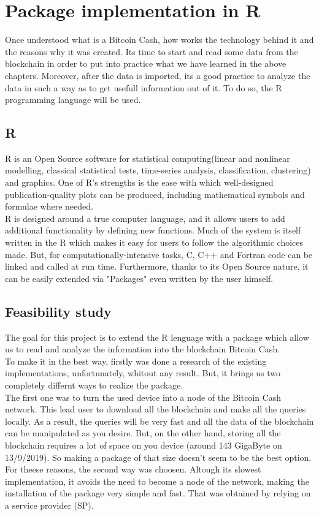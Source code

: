 
\chapter{Package implementation in R}
\label{cha:R}

Once understood what is a Bitcoin Cash, how works the technology behind it and the
reasons why it was created. Its time to start and read some data from the blockchain
in order to put into practice what we have learned in the above chapters. Moreover,
after the data is imported, its a good practice to analyze the data in such a way as to 
get usefull information out of it. To do so, the R programming language will be used.

\section{R}
\label{sec:enivirionment}

R is an Open Source software for statistical computing(linear and nonlinear
 modelling, classical statistical tests, time-series analysis, classification,
 clustering) and graphics. One of R’s strengths is the ease with which well-designed 
 publication-quality plots can be produced, including mathematical symbols and 
 formulae where needed.\\
R is designed around a true computer language, and it allows users to add additional 
functionality by defining new functions. Much of the system is itself written in the 
R which makes it easy for users to follow the algorithmic choices made. But, for
computationally-intensive tasks, C, C++ and Fortran code can be linked and called 
at run time. Furthermore, thanks to its Open Source nature, it can be easily extended
via "Packages" even written by the user himself.\cite{r}

\section{Feasibility study}
\label{sec:study}

The goal for this project is to extend the R lenguage with a package which allow us
to read and analyze the information into the blockchain Bitcoin Cash.\\
To make it in the best way, firstly was done a research of the existing 
implementations, unfortunately, whitout any result. But, it brings us two 
completely differnt ways to realize the package. \\
The first one was to turn the used device into a node of the Bitcoin Cash network.
This lead user to download all the blockchain and make all the queries locally.
As a result, the queries will be very fast and all the data of the blockchain can
be manipulated as you desire. But, on the other hand, storing all the blockchain 
requires a lot of space on you device (around 143 GigaByte on 13/9/2019). So making
a package of that size doesn't seem to be the best option.\\
For theese reasons, the second way was choosen. Altough its slowest implementation,
it avoids the need to become a node of the network, making the installation of the
package very simple and fast. That was obtained by relying on a service provider (SP).

